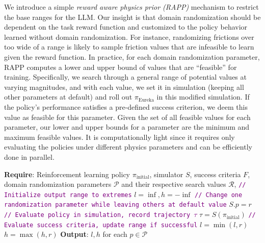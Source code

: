\documentclass[conference]{IEEEtran}
\begin{document}
We introduce a simple \textit{reward aware physics prior (RAPP)} mechanism to restrict the base ranges for the LLM.  Our insight is that domain randomization should be dependent on the task reward function and customized to the policy behavior learned without domain randomization.
For instance, randomizing frictions over too wide of a range is likely to sample friction values that are infeasible to learn given the reward function. 
In practice, for each domain randomization parameter, RAPP computes a lower and upper bound of values that are ``feasible'' for training. Specifically, we search through a general range of potential values at varying magnitudes, and with each value, we set it in simulation (keeping all other parameters at default) and roll out $\pi_{\text{Eureka}}$ in this modified simulation. If the policy's performance satisfies a pre-defined success criterion, we deem this value as feasible for this parameter. Given the set of all feasible values for each parameter, our lower and upper bounds for a parameter are the minimum and maximum feasible values. It is computationally light since it requires only evaluating the policies under different physics parameters and can be efficiently done in parallel. 






\begin{algorithm}[H]
\caption{Reward Aware Physics Prior (RAPP)}
\label{algo:physics-prior}
\begin{algorithmic}[1]
\small
\STATE \textbf{Require}: Reinforcement learning policy $\pi_{\text{initial}}$, simulator $S$, success criteria $F$, domain randomization parameters $\mathcal{P}$ and their respective search values $\mathcal{R}$, 
\STATE \textcolor{purple}{\texttt{// Initialize output range to extremes}}
\STATE $l = \inf, h = -\inf$
\STATE \textcolor{purple}{\texttt{// Change one randomization parameter while leaving others at default value}}
\STATE $S.p = r$
\STATE \textcolor{purple}{\texttt{// Evaluate policy in simulation, record trajectory $\tau$}}
\STATE $\tau = S(\pi_{\text{initial}})$
\STATE \textcolor{purple}{\texttt{// Evaluate success criteria, update range if successful}}
\STATE $l = \min(l, r)$
\STATE $h = \max(h, r)$
\ENDIF
\ENDFOR
\ENDFOR
\STATE \textbf{Output}: $l, h$ for each $p \in \mathcal{P}$
\end{algorithmic}
\end{algorithm}
\end{document}
